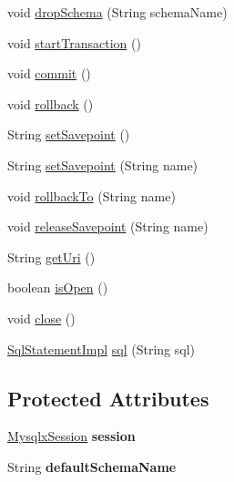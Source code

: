 \begin{DoxyCompactItemize}
\item 
void \mbox{\hyperlink{classcom_1_1mysql_1_1cj_1_1xdevapi_1_1_session_impl_acc48589d267536ca687a05dfb315415c}{drop\+Schema}} (String schema\+Name)
\item 
void \mbox{\hyperlink{classcom_1_1mysql_1_1cj_1_1xdevapi_1_1_session_impl_a765f8d81a34ca32d608bdeb5e56e3119}{start\+Transaction}} ()
\item 
void \mbox{\hyperlink{classcom_1_1mysql_1_1cj_1_1xdevapi_1_1_session_impl_a63bd825fc3c1d7b27cd7294bef2c8a65}{commit}} ()
\item 
void \mbox{\hyperlink{classcom_1_1mysql_1_1cj_1_1xdevapi_1_1_session_impl_a7c11c5d1f54f7a1f6ad2c0891dd59a67}{rollback}} ()
\item 
String \mbox{\hyperlink{classcom_1_1mysql_1_1cj_1_1xdevapi_1_1_session_impl_a3eb7fd3b8ff1e2fc436fc271f1129fae}{set\+Savepoint}} ()
\item 
String \mbox{\hyperlink{classcom_1_1mysql_1_1cj_1_1xdevapi_1_1_session_impl_a4425c6c14d6b1159a23c0ede2b2e120d}{set\+Savepoint}} (String name)
\item 
void \mbox{\hyperlink{classcom_1_1mysql_1_1cj_1_1xdevapi_1_1_session_impl_adcd0910556c2529fe20a6fa85c96a88d}{rollback\+To}} (String name)
\item 
void \mbox{\hyperlink{classcom_1_1mysql_1_1cj_1_1xdevapi_1_1_session_impl_a8bf42a1928a6bb71f3047e072b9210b4}{release\+Savepoint}} (String name)
\item 
String \mbox{\hyperlink{classcom_1_1mysql_1_1cj_1_1xdevapi_1_1_session_impl_af181caf1c47641912a47ef9445a9ddca}{get\+Uri}} ()
\item 
boolean \mbox{\hyperlink{classcom_1_1mysql_1_1cj_1_1xdevapi_1_1_session_impl_a0b6cff692d4e7882a546118b25820978}{is\+Open}} ()
\item 
void \mbox{\hyperlink{classcom_1_1mysql_1_1cj_1_1xdevapi_1_1_session_impl_a84c222e009725cc3984f4edd56effec8}{close}} ()
\item 
\mbox{\hyperlink{classcom_1_1mysql_1_1cj_1_1xdevapi_1_1_sql_statement_impl}{Sql\+Statement\+Impl}} \mbox{\hyperlink{classcom_1_1mysql_1_1cj_1_1xdevapi_1_1_session_impl_a28b412626c5f92aa146ede32d4e8033d}{sql}} (String sql)
\end{DoxyCompactItemize}
\subsection*{Protected Attributes}
\begin{DoxyCompactItemize}
\item 
\mbox{\label{classcom_1_1mysql_1_1cj_1_1xdevapi_1_1_session_impl_a24bb736eef317972feb7dfeaad760f82}} 
\mbox{\hyperlink{classcom_1_1mysql_1_1cj_1_1_mysqlx_session}{Mysqlx\+Session}} {\bfseries session}
\item 
\mbox{\label{classcom_1_1mysql_1_1cj_1_1xdevapi_1_1_session_impl_adce486defa0eedb92c66d0a7daf58551}} 
String {\bfseries default\+Schema\+Name}
\end{DoxyCompactItemize}


